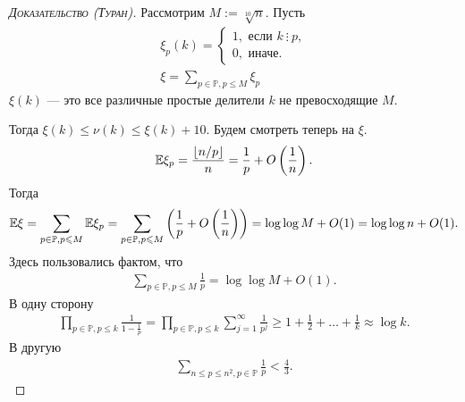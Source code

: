 \documentclass[../main.tex]{subfiles}
\begin{document}
\begin{proof}[\normalfont\textsc{Доказательство (Туран)}]
 Рассмотрим $ M := \sqrt[10] n $. Пусть
 \begin{align*}
  \xi_p(k) = \begin{cases}
   1, \text{ если } k \ \vdots \ p, \\
   0, \text{ иначе. }
  \end{cases} \\
  \xi = \sum_{p \in \mathbb P, p \leqslant M} \xi_p
 \end{align*} $ \xi(k) $ --- это все различные простые делители $ k $ не превосходящие $M$.
 
 Тогда $ \xi(k) \leqslant \nu(k) \leqslant \xi(k) + 10$. Будем смотреть теперь на $ \xi $.
 \begin{align*}
  \mathbb E\xi_p = \frac{\left\lfloor n / p \right\rfloor }{n} = \frac{1}{p} + O\left(\frac{1}{n}\right).
 \end{align*} Тогда
 \begin{align*}
  \mathbb E\xi = \sum_{p \in \mathbb P, p \leqslant M} \mathbb E\xi_p = \sum_{p \in \mathbb P, p \leqslant M}\left(\frac{1}{p} + O \left( \frac{1}{n} \right) \right) = \log\log M + O(1) = \log\log n + O(1).
 \end{align*} Здесь пользовались фактом, что
 \begin{align*}
  \sum_{p \in \mathbb P, p \leqslant M}  \frac{1}{p} = \log \log M + O(1).
 \end{align*}
 В одну сторону
 \begin{align*}
  \prod_{p \in \mathbb P, p \leqslant k} \frac{1}{1 - \frac{1}{p}} = \prod_{p \in \mathbb P, p \leqslant k} \sum_{j=1}^{\infty} \frac{1}{p^{j}} \geqslant 1 + \frac{1}{2} + \ldots + \frac{1}{k} \approx \log k.
 \end{align*} В другую
 \begin{align*}
  \sum_{n \leqslant p \leqslant n^{2}, p \in \mathbb P} \frac{1}{p} < \frac{4}{3}.
 \end{align*} 


\end{proof}
\end{document}
